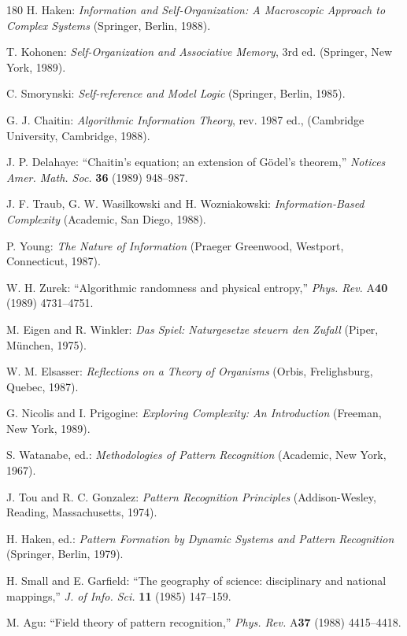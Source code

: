 \documentclass[11pt]{article}
\begin{document}
\begin{thebibliography}{180}
		H. Haken: \emph{Information and Self-Organization: A Macroscopic Approach to Complex Systems} (Springer, Berlin, 1988).
		
		T. Kohonen: \emph{Self-Organization and Associative Memory}, 3rd ed. (Springer, New York, 1989).
		
		C. Smorynski: \emph{Self-reference and Model Logic} (Springer, Berlin, 1985).
		
		G. J. Chaitin: \emph{Algorithmic Information Theory}, rev. 1987 ed., (Cambridge University, Cambridge, 1988).
		
		J. P. Delahaye: ``Chaitin's equation; an extension of Gödel's theorem,'' \emph{Notices Amer. Math. Soc.} \textbf{36} (1989) 948--987.
		
		J. F. Traub, G. W. Wasilkowski and H. Wozniakowski: \emph{Information-Based Complexity} (Academic, San Diego, 1988).
		
		P. Young: \emph{The Nature of Information} (Praeger Greenwood, Westport, Connecticut, 1987).
		
		W. H. Zurek: ``Algorithmic randomness and physical entropy,'' \emph{Phys. Rev.} A\textbf{40} (1989) 4731--4751.
		
		M. Eigen and R. Winkler: \emph{Das Spiel: Naturgesetze steuern den Zufall} (Piper, München, 1975).
		
		W. M. Elsasser: \emph{Reflections on a Theory of Organisms} (Orbis, Frelighsburg, Quebec, 1987).
		
		G. Nicolis and I. Prigogine: \emph{Exploring Complexity: An Introduction} (Freeman, New York, 1989).
		
		S. Watanabe, ed.: \emph{Methodologies of Pattern Recognition} (Academic, New York, 1967).
		
		J. Tou and R. C. Gonzalez: \emph{Pattern Recognition Principles} (Addison-Wesley, Reading, Massachusetts, 1974).
		
		H. Haken, ed.: \emph{Pattern Formation by Dynamic Systems and Pattern Recognition} (Springer, Berlin, 1979).
		
		H. Small and E. Garfield: ``The geography of science: disciplinary and national mappings,'' \emph{J. of Info. Sci.} \textbf{11} (1985) 147--159.
		
		M. Agu: ``Field theory of pattern recognition,'' \emph{Phys. Rev.} A\textbf{37} (1988) 4415--4418.
		

\end{thebibliography}
\end{document}
